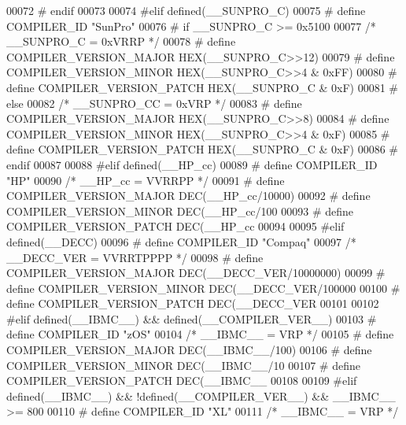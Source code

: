 \begin{DoxyCode}
{{{{{{{{{00072 \textcolor{preprocessor}{# endif}
00073 
00074 \textcolor{preprocessor}{#elif defined(\_\_SUNPRO\_C)}
00075 \textcolor{preprocessor}{# define COMPILER\_ID "SunPro"}
00076 \textcolor{preprocessor}{# if \_\_SUNPRO\_C >= 0x5100}
00077    \textcolor{comment}{/* \_\_SUNPRO\_C = 0xVRRP */}
00078 \textcolor{preprocessor}{#  define COMPILER\_VERSION\_MAJOR HEX(\_\_SUNPRO\_C>>12)}
00079 \textcolor{preprocessor}{#  define COMPILER\_VERSION\_MINOR HEX(\_\_SUNPRO\_C>>4 & 0xFF)}
00080 \textcolor{preprocessor}{#  define COMPILER\_VERSION\_PATCH HEX(\_\_SUNPRO\_C    & 0xF)}
00081 \textcolor{preprocessor}{# else}
00082    \textcolor{comment}{/* \_\_SUNPRO\_CC = 0xVRP */}
00083 \textcolor{preprocessor}{#  define COMPILER\_VERSION\_MAJOR HEX(\_\_SUNPRO\_C>>8)}
00084 \textcolor{preprocessor}{#  define COMPILER\_VERSION\_MINOR HEX(\_\_SUNPRO\_C>>4 & 0xF)}
00085 \textcolor{preprocessor}{#  define COMPILER\_VERSION\_PATCH HEX(\_\_SUNPRO\_C    & 0xF)}
00086 \textcolor{preprocessor}{# endif}
00087 
00088 \textcolor{preprocessor}{#elif defined(\_\_HP\_cc)}
00089 \textcolor{preprocessor}{# define COMPILER\_ID "HP"}
00090   \textcolor{comment}{/* \_\_HP\_cc = VVRRPP */}
00091 \textcolor{preprocessor}{# define COMPILER\_VERSION\_MAJOR DEC(\_\_HP\_cc/10000)}
00092 \textcolor{preprocessor}{# define COMPILER\_VERSION\_MINOR DEC(\_\_HP\_cc/100 %
00093 \textcolor{preprocessor}{# define COMPILER\_VERSION\_PATCH DEC(\_\_HP\_cc     %
00094 
00095 \textcolor{preprocessor}{#elif defined(\_\_DECC)}
00096 \textcolor{preprocessor}{# define COMPILER\_ID "Compaq"}
00097   \textcolor{comment}{/* \_\_DECC\_VER = VVRRTPPPP */}
00098 \textcolor{preprocessor}{# define COMPILER\_VERSION\_MAJOR DEC(\_\_DECC\_VER/10000000)}
00099 \textcolor{preprocessor}{# define COMPILER\_VERSION\_MINOR DEC(\_\_DECC\_VER/100000  %
00100 \textcolor{preprocessor}{# define COMPILER\_VERSION\_PATCH DEC(\_\_DECC\_VER         %
00101 
00102 \textcolor{preprocessor}{#elif defined(\_\_IBMC\_\_) && defined(\_\_COMPILER\_VER\_\_)}
00103 \textcolor{preprocessor}{# define COMPILER\_ID "zOS"}
00104   \textcolor{comment}{/* \_\_IBMC\_\_ = VRP */}
00105 \textcolor{preprocessor}{# define COMPILER\_VERSION\_MAJOR DEC(\_\_IBMC\_\_/100)}
00106 \textcolor{preprocessor}{# define COMPILER\_VERSION\_MINOR DEC(\_\_IBMC\_\_/10 %
00107 \textcolor{preprocessor}{# define COMPILER\_VERSION\_PATCH DEC(\_\_IBMC\_\_    %
00108 
00109 \textcolor{preprocessor}{#elif defined(\_\_IBMC\_\_) && !defined(\_\_COMPILER\_VER\_\_) && \_\_IBMC\_\_ >= 800}
00110 \textcolor{preprocessor}{# define COMPILER\_ID "XL"}
00111   \textcolor{comment}{/* \_\_IBMC\_\_ = VRP */}
}}}}}}}}}}}}}}}
\end{DoxyCode}
